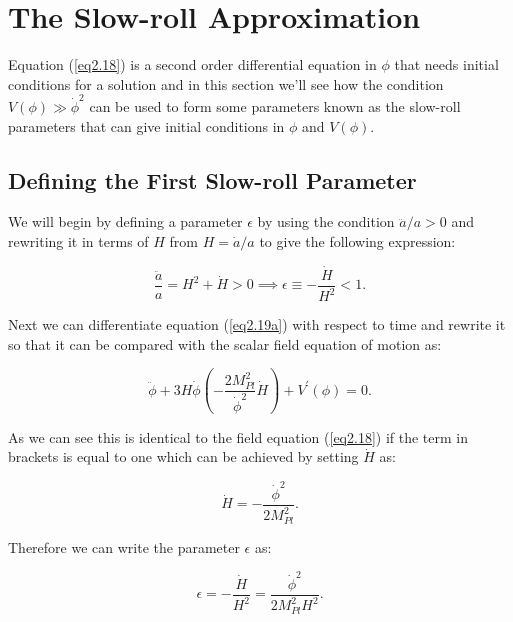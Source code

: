 \documentclass[a4paper,12pt,twoside]{report}
\begin{document}
\section{The Slow-roll Approximation} \label{sec:SlowRollApprox}

Equation (\ref{eq2.18}) is a second order differential equation in $\phi$ that needs initial conditions for a solution and in this section we'll see how the condition $V(\phi) \gg \dot{\phi}^{2}$ can be used to form some parameters known as the slow-roll parameters that can give initial conditions in $\phi$ and $V(\phi)$.

\subsection{Defining the First Slow-roll Parameter} \label{subsec:DefFirstSparam}

We will begin by defining a parameter $\epsilon$ by using the condition $\ddot{a}/a > 0$ and rewriting it in terms of $H$ from $H = \dot{a} / a$ to give the following expression:

\begin{equation} \label{eq2.20}
\frac{\ddot{a}}{a} = H^{2} + \dot{H} > 0 \implies \epsilon \equiv - \frac{\dot{H}}{H^{2}} < 1.
\end{equation}

Next we can differentiate equation (\ref{eq2.19a}) with respect to time and rewrite it so that it can be compared with the scalar field equation of motion as:

\begin{equation} \label{eq2.21}
\ddot{\phi} + 3H\dot{\phi} \left(-\frac{2M_{Pl}^{2}}{\dot{\phi}^{2}} \dot{H} \right) + V^{\prime}(\phi) = 0.
\end{equation}

As we can see this is identical to the field equation (\ref{eq2.18}) if the term in brackets is equal to one which can be achieved by setting $\dot{H}$ as:

\begin{equation} \label{eq2.22}
\dot{H} = - \frac{\dot{\phi}^{2}}{2 M_{Pl}^{2}}.
\end{equation}

Therefore we can write the parameter $\epsilon$ as:

\begin{equation} \label{eq2.23}
\epsilon = - \frac{\dot{H}}{H^{2}} = \frac{\dot{\phi}^{2}}{2 M_{Pl}^{2} H^{2}}.
\end{equation}
\end{document}
